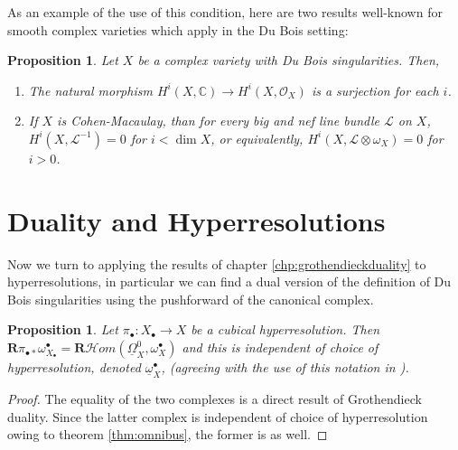 \documentclass[proquest]{uwthesis}[2014/11/13]
\newtheorem{prop}[theorem]{Proposition}
\theoremstyle{definition}
\newcommand{\cHom}{\mathcal{H} \textit{om}}
\newcommand{\CC}{\mathbb{C}}
\newcommand{\LL}{\mathcal{L}}
\newcommand{\OO}{\mathcal{O}}
\newcommand{\bR}{\textbf{R}}
\newcommand{\DB}{\underline{\Omega}}
\newcommand{\db}{\underline{\omega}^\bullet}
\begin{document}
As an example of the use of this condition, here are two results well-known for smooth complex varieties which apply in the Du Bois setting:

\begin{prop}
	Let $X$ be a complex variety with Du Bois singularities.
	Then,
	\begin{enumerate}
		\item The natural morphism $H^i(X, \CC) \rightarrow H^i(X, \OO_X)$ is a surjection for each $i$.
		\item If $X$ is Cohen-Macaulay, than for every big and nef line bundle $\LL$ on $X$, $H^i(X, \LL^{-1}) = 0$ for $i < \dim X$, or equivalently, $H^i(X, \LL \otimes \omega_X) = 0$ for $i > 0$.
	\end{enumerate}
\end{prop}

\section{Duality and Hyperresolutions}
Now we turn to applying the results of chapter \ref{chp:grothendieckduality} to hyperresolutions, in particular we can find a dual version of the definition of Du Bois singularities using the pushforward of the canonical complex.

\begin{prop}
	Let $\pi_\bullet : X_\bullet \rightarrow X$ be a cubical hyperresolution.
	Then $\bR \pi_{\bullet *} \omega_{X_\bullet}^\bullet = \bR \cHom(\DB_X^0,\omega_X^\bullet)$ and this is independent of choice of hyperresolution, denoted $\db_X$, (agreeing with the use of this notation in \cite{Kovacs2011a}).
\end{prop}
\begin{proof}
	The equality of the two complexes is a direct result of Grothendieck duality.
	Since the latter complex is independent of choice of hyperresolution owing to theorem \ref{thm:omnibus}, the former is as well.
\end{proof}
\end{document}
